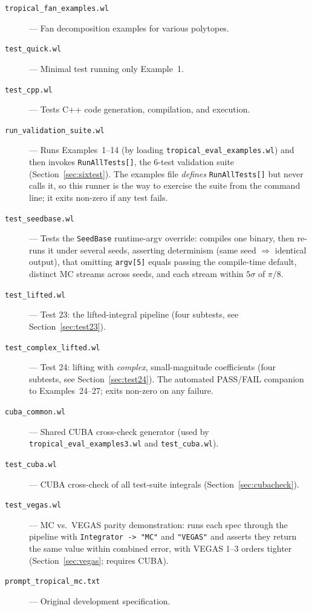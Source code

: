 \documentclass[11pt,a4paper]{article}
\begin{document}
\begin{description}
  \item[\texttt{tropical\_fan\_examples.wl}] --- Fan decomposition examples for various polytopes.
  \item[\texttt{test\_quick.wl}] --- Minimal test running only Example~1.
  \item[\texttt{test\_cpp.wl}] --- Tests C++ code generation, compilation, and execution.
  \item[\texttt{run\_validation\_suite.wl}] --- Runs Examples~1--14 (by loading \texttt{tropical\_eval\_examples.wl}) and then invokes \texttt{RunAllTests[]}, the 6-test validation suite (Section~\ref{sec:sixtest}). The examples file \emph{defines} \texttt{RunAllTests[]} but never calls it, so this runner is the way to exercise the suite from the command line; it exits non-zero if any test fails.
  \item[\texttt{test\_seedbase.wl}] --- Tests the \texttt{SeedBase} runtime-argv override: compiles one binary, then re-runs it under several seeds, asserting determinism (same seed $\Rightarrow$ identical output), that omitting \texttt{argv[5]} equals passing the compile-time default, distinct MC streams across seeds, and each stream within $5\sigma$ of $\pi/8$.
  \item[\texttt{test\_lifted.wl}] --- Test 23: the lifted-integral pipeline (four subtests, see Section~\ref{sec:test23}).
  \item[\texttt{test\_complex\_lifted.wl}] --- Test 24: lifting with \emph{complex}, small-magnitude coefficients (four subtests, see Section~\ref{sec:test24}). The automated PASS/FAIL companion to Examples~24--27; exits non-zero on any failure.
  \item[\texttt{cuba\_common.wl}] --- Shared CUBA cross-check generator (used by \texttt{tropical\_eval\_examples3.wl} and \texttt{test\_cuba.wl}).
  \item[\texttt{test\_cuba.wl}] --- CUBA cross-check of all test-suite integrals (Section~\ref{sec:cubacheck}).
  \item[\texttt{test\_vegas.wl}] --- MC vs.\ VEGAS parity demonstration: runs each spec through the pipeline with \texttt{Integrator -> "MC"} and \texttt{"VEGAS"} and asserts they return the same value within combined error, with VEGAS 1--3 orders tighter (Section~\ref{sec:vegas}; requires CUBA).
  \item[\texttt{prompt\_tropical\_mc.txt}] --- Original development specification.
\end{description}
\end{document}
